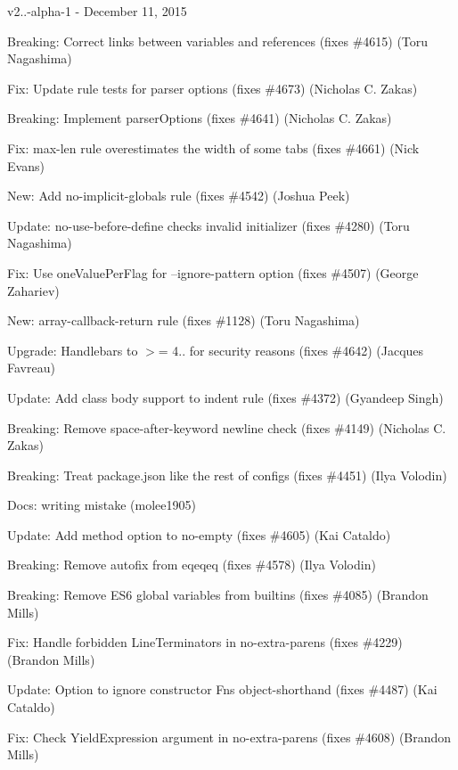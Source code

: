 v2..-\/alpha-\/1 -\/ December 11, 2015


\begin{DoxyItemize}
\item Breaking\+: Correct links between variables and references (fixes \#4615) (Toru Nagashima)
\item Fix\+: Update rule tests for parser options (fixes \#4673) (Nicholas C. Zakas)
\item Breaking\+: Implement parser\+Options (fixes \#4641) (Nicholas C. Zakas)
\item Fix\+: max-\/len rule overestimates the width of some tabs (fixes \#4661) (Nick Evans)
\item New\+: Add no-\/implicit-\/globals rule (fixes \#4542) (Joshua Peek)
\item Update\+: {\ttfamily no-\/use-\/before-\/define} checks invalid initializer (fixes \#4280) (Toru Nagashima)
\item Fix\+: Use one\+Value\+Per\+Flag for --ignore-\/pattern option (fixes \#4507) (George Zahariev)
\item New\+: {\ttfamily array-\/callback-\/return} rule (fixes \#1128) (Toru Nagashima)
\item Upgrade\+: Handlebars to $>$= 4.. for security reasons (fixes \#4642) (Jacques Favreau)
\item Update\+: Add class body support to {\ttfamily indent} rule (fixes \#4372) (Gyandeep Singh)
\item Breaking\+: Remove space-\/after-\/keyword newline check (fixes \#4149) (Nicholas C. Zakas)
\item Breaking\+: Treat package.\+json like the rest of configs (fixes \#4451) (Ilya Volodin)
\item Docs\+: writing mistake (molee1905)
\item Update\+: Add \textquotesingle{}method\textquotesingle{} option to no-\/empty (fixes \#4605) (Kai Cataldo)
\item Breaking\+: Remove autofix from eqeqeq (fixes \#4578) (Ilya Volodin)
\item Breaking\+: Remove E\+S6 global variables from builtins (fixes \#4085) (Brandon Mills)
\item Fix\+: Handle forbidden Line\+Terminators in no-\/extra-\/parens (fixes \#4229) (Brandon Mills)
\item Update\+: Option to ignore constructor Fns object-\/shorthand (fixes \#4487) (Kai Cataldo)
\item Fix\+: Check Yield\+Expression argument in no-\/extra-\/parens (fixes \#4608) (Brandon Mills)

\end{DoxyItemize}
